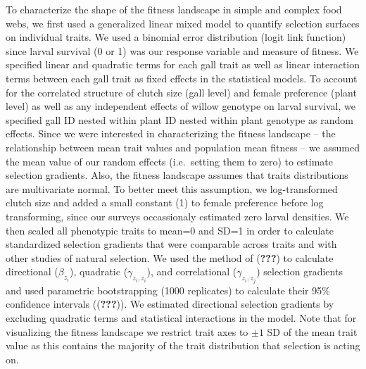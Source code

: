 \documentclass[]{elsarticle} %
\begin{document}
To characterize the shape of the fitness landscape in simple and complex
food webs, we first used a generalized linear mixed model to quantify
selection surfaces on individual traits. We used a binomial error
distribution (logit link function) since larval survival (0 or 1) was
our response variable and measure of fitness. We specified linear and
quadratic terms for each gall trait as well as linear interaction terms
between each gall trait as fixed effects in the statistical models. To
account for the correlated structure of clutch size (gall level) and
female preference (plant level) as well as any independent effects of
willow genotype on larval survival, we specified gall ID nested within
plant ID nested within plant genotype as random effects. Since we were
interested in characterizing the fitness landscape -- the relationship
between mean trait values and population mean fitness -- we assumed the
mean value of our random effects (i.e.~setting them to zero) to estimate
selection gradients. Also, the fitness landscape assumes that traits
distributions are multivariate normal. To better meet this assumption,
we log-transformed clutch size and added a small constant (1) to female
preference before log transforming, since our surveys occassionaly
estimated zero larval densities. We then scaled all phenotypic traits to
mean=0 and SD=1 in order to calculate standardized selection gradients
that were comparable across traits and with other studies of natural
selection. We used the method of ({\textbf{???}}) to calculate
directional (\(\beta_{z_i}\)), quadratic (\(\gamma_{z_i,z_i}\)), and
correlational (\(\gamma_{z_i,z_j}\)) selection gradients and used
parametric bootstrapping (1000 replicates) to calculate their 95\%
confidence intervals (({\textbf{???}})). We estimated directional
selection gradients by excluding quadratic terms and statistical
interactions in the model. Note that for visualizing the fitness
landscape we restrict trait axes to \(\pm 1\) SD of the mean trait value
as this contains the majority of the trait distribution that selection
is acting on.
\end{document}
